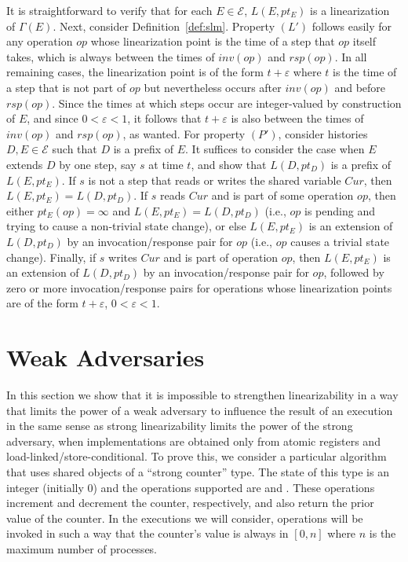 \documentclass[11pt,letterpaper]{article}
\newcommand{\eps}{\varepsilon}
\newcommand{\EE}{\mathcal{E}}
\newcommand{\op}{\ensuremath{\mathit{op}}}
\newcommand{\inv}[1]{\ensuremath{inv(#1)}}
\newcommand{\rsp}[1]{\ensuremath{rsp(#1)}}
\begin{document}
It is straightforward to verify that for each $E \in \EE$, $L(E,pt_E)$ is a linearization of $\Gamma(E)$.
Next, consider Definition~\ref{def:slm}.
Property $(L')$ follows easily for any operation $\op$ whose linearization point is
   the time of a step that $\op$ itself takes, which is always between the
   times of $\inv{\op}$ and $\rsp{\op}$.
In all remaining cases, the linearization point is of the form $t + \eps$ where $t$ is the time
   of a step that is not part of $\op$ but nevertheless occurs after $\inv{\op}$ and before $\rsp{\op}$.
Since the times at which steps occur are integer-valued by construction of $E$, and since $0 < \eps < 1$, it follows
   that $t + \eps$ is also between the times of $\inv{\op}$ and $\rsp{\op}$, as wanted.
For property $(P')$, consider histories $D,E \in \EE$ such that $D$ is a prefix of $E$.
It suffices to consider the case when $E$ extends $D$ by one step, say $s$ at time $t$,
   and show that $L(D, pt_D)$ is a prefix of $L(E,pt_E)$.
If $s$ is not a step that reads or writes the shared variable $Cur$, then $L(E,pt_E) = L(D, pt_D)$.
If $s$ reads $Cur$ and is part of some operation $\op$, then either $pt_E(\op) = \infty$ and
   $L(E,pt_E) = L(D, pt_D)$ (i.e., $\op$ is pending and trying to cause a non-trivial state change),
   or else $L(E,pt_E)$ is an extension of $L(D, pt_D)$ by an invocation/response pair for $\op$
   (i.e., $\op$ causes a trivial state change).
Finally, if $s$ writes $Cur$ and is part of operation $\op$, then $L(E,pt_E)$ is an extension of
   $L(D, pt_D)$ by an invocation/response pair for $\op$, followed by zero or more
   invocation/response pairs for operations whose linearization points are of the form $t + \eps$,
   $0 < \eps < 1$.






\section{Weak Adversaries}
\label{weakAdversary.sec}
In this section we show that it is impossible to strengthen linearizability in a way that limits the power of
a weak adversary to influence the result of an execution in the same sense as strong linearizability limits the
power of the strong adversary, when implementations are obtained only from atomic registers and load-linked/store-conditional.
To prove this, we consider a particular algorithm that uses shared objects of a ``strong counter'' type.
The state of this type is an integer (initially 0) and the operations supported are \FAI{} and \FAD{}.
These operations increment and decrement the counter, respectively, and also return the prior value of the counter.
In the executions we will consider, operations will be invoked in such a way that the counter's value
is always in $[0, n]$ where $n$ is the maximum number of processes.
\end{document}
